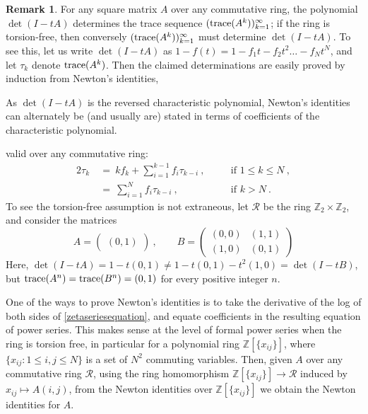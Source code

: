 \documentclass{amsart}
\newcommand{\si}{\index}
\theoremstyle{definition}
\newtheorem{rem}[equation]{Remark}
\theoremstyle{definition}
\newcommand{\Z}{\mathbb Z}
\newcommand{\tr}{\textnormal{trace}}
\numberwithin{equation}{subsection}
\begin{document}
\begin{rem} \label{NewtonIdentities}
For any square matrix $A$  over any commutative ring, the polynomial $\det(I-tA)$
determines the trace sequence\si{trace sequence} $(\tr (A^k))_{k=1}^{\infty}$; if the ring is
torsion-free, then conversely $(\tr (A^k))_{k=1}^{\infty}$ must determine
$\det(I-tA)$.
 To see this, let us write
$\det (I-tA)$ as $1-f(t) = 1 -f_1t -f_2t^2 \dots -f_Nt^N$,
and let $\tau_k$ denote $\tr (A^k)$.
Then the claimed determinations are easily proved by induction
from Newton's identities,\begin{footnote}{As $\det (I-tA)$ is the reversed
characteristic polynomial, Newton's identities
can alternately  be (and usually are)
stated in terms of coefficients of the characteristic polynomial.}
\end{footnote} valid over any commutative ring:
\begin{alignat*}{2}
\tau_k \ & = \ kf_k +\sum_{i=1}^{k-1}f_i\tau_{k-i}\ , \quad && \text{if } 1\leq k \leq N\ , \\
& =\  \sum_{i=1}^{N}f_i\tau_{k-i}\ , \quad && \text{if }  k > N\ .
\end{alignat*}
To see the torsion-free assumption is not extraneous,
let $\mathcal R$ be the ring $\Z_2 \times \Z_2$, and consider the matrices
\[
A = \begin{pmatrix} (0,1)
\end{pmatrix} \ , \qquad
B
= \begin{pmatrix} (0,0) & (1,1) \\ (1,0) & (0,1)
\end{pmatrix}
\]
Here,  $\det(I-tA) = 1 -t (0,1) \neq 1 -t (0,1) -t^2(1,0) = \det(I-tB) $,
but $\tr (A^n) = \tr (B^n) = (0,1)$ for every positive integer $n$.

One of the ways to prove Newton's identities is to take the derivative of the
log of both sides of \eqref{zetaseriesequation}, and equate coefficients in the resulting
equation of power series. This makes sense at the level of formal
power series when the ring is torsion free, in particular for a polynomial ring
$\Z [\{x_{ij}\}]$, where $\{ x_{ij} : 1\leq i,j \leq N\}$ is a set of $N^2$
commuting variables. Then, given $A$ over any commutative ring $\mathcal R$,
using the ring homomorphism $\Z [\{x_{ij}\}] \to \mathcal R$ induced by
$x_{ij} \mapsto A(i,j)$, from the Newton identities over
$\Z [\{x_{ij}\}]$ we obtain the Newton identities for $A$.
\end{rem}
\end{document}
